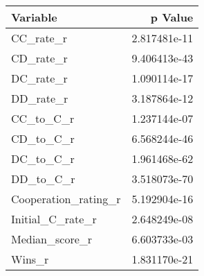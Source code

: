 
\begin{tabular}{lr}
\toprule
Variable &       p Value \\
\midrule
CC\_rate\_r &  2.817481e-11 \\
CD\_rate\_r &  9.406413e-43 \\
DC\_rate\_r &  1.090114e-17 \\
DD\_rate\_r &  3.187864e-12 \\
CC\_to\_C\_r &  1.237144e-07 \\
CD\_to\_C\_r &  6.568244e-46 \\
DC\_to\_C\_r &  1.961468e-62 \\
DD\_to\_C\_r &  3.518073e-70 \\
Cooperation\_rating\_r &  5.192904e-16 \\
Initial\_C\_rate\_r &  2.648249e-08 \\
Median\_score\_r &  6.603733e-03 \\
Wins\_r &  1.831170e-21 \\
\bottomrule

\end{tabular}

